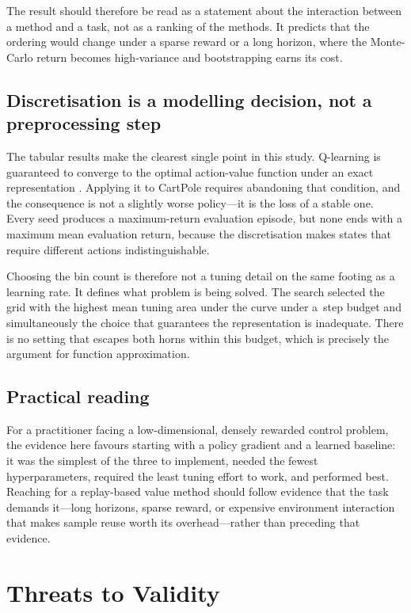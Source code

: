 \documentclass[conference]{IEEEtran}
\begin{document}
The result should therefore be read as a statement about the interaction between
a method and a task, not as a ranking of the methods. It predicts that the
ordering would change under a sparse reward or a long horizon, where the
Monte-Carlo return becomes high-variance and bootstrapping earns its cost.

\subsection{Discretisation is a modelling decision, not a preprocessing step}

The tabular results make the clearest single point in this study. Q-learning is
guaranteed to converge to the optimal action-value function under an exact
representation \cite{watkins1992}. Applying it to CartPole requires abandoning
that condition, and the consequence is not a slightly worse policy---it is the
loss of a stable one. Every seed produces a maximum-return evaluation episode,
but none ends with a maximum mean evaluation return, because the discretisation makes states that require
different actions indistinguishable.

Choosing the bin count is therefore not a tuning detail on the same footing as a
learning rate. It defines what problem is being solved. The search selected the
grid with the highest mean tuning area under the curve under a
\StepBudget{}\,step budget and simultaneously the choice that guarantees the
representation is inadequate. There is no setting that escapes both horns within
this budget, which is precisely the argument for function approximation.

\subsection{Practical reading}

For a practitioner facing a low-dimensional, densely rewarded control problem, the
evidence here favours starting with a policy gradient and a learned baseline: it
was the simplest of the three to implement, needed the fewest hyperparameters,
required the least tuning effort to work, and performed best. Reaching for a
replay-based value method should follow evidence that the task demands it---long
horizons, sparse reward, or expensive environment interaction that makes sample
reuse worth its overhead---rather than preceding that evidence.

\section{Threats to Validity}
\end{document}
